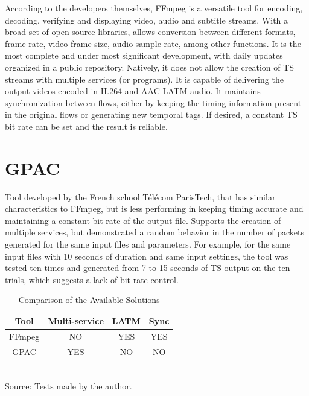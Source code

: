 \documentclass[
	12pt,				%
	openright,			%
	twoside,			%
	a4paper,			%
	brazil,
	french,				%
	english
	]{abntex2}
\begin{document}
According to the developers themselves, FFmpeg is a versatile tool for encoding, decoding, verifying and displaying video, audio and subtitle streams. With a broad set of open source libraries, allows conversion between different formats, frame rate, video frame size, audio sample rate, among other functions. It is the most complete and under most significant development, with daily updates organized in a public repository.
Natively, it does not allow the creation of TS streams with multiple services (or programs). It is capable of delivering the output videos encoded in H.264 and AAC-LATM audio. It maintains synchronization between flows, either by keeping the timing information present in the original flows or generating new temporal tags. If desired, a constant TS bit rate can be set and the result is reliable.


\section{GPAC}

Tool developed by the French school Télécom ParisTech, that has similar characteristics to FFmpeg, but is less performing in keeping timing accurate and maintaining a constant bit rate of the output file. Supports the creation of multiple services, but demonstrated a random behavior in the number of packets generated for the same input files and parameters. For example, for the same input files with 10 seconds of duration and same input settings, the tool was tested ten times and generated from 7 to 15 seconds of TS output on the ten trials, which suggests a lack of bit rate control.

\begin{table}[!htpd]
\caption{Comparison of the Available Solutions}
\begin{center}
\begin{tabular}{|c|c|c|c|}
\hline
Tool & Multi-service & LATM & Sync\\
\hline
FFmpeg & NO & YES & YES\\
\hline
GPAC & YES & NO & NO\\
\hline
\end{tabular}
\label{tab_comparison_tools}
\\Source: Tests made by the author.
\end{center}
\end{table}
\end{document}

